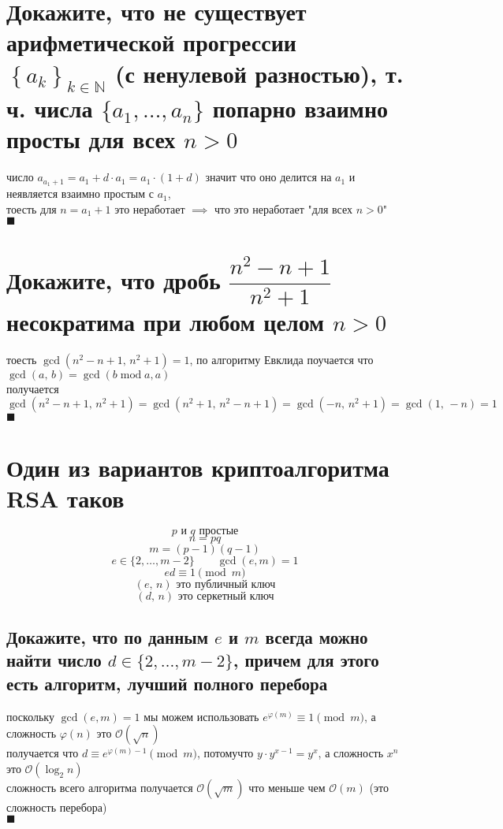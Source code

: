 \documentclass{article}
\newcommand{\Mod}[1]{\pmod{#1}}
\renewcommand{\mod}{\operatorname{mod}}
\newcommand{\bigO}{\mathcal{O}}
\begin{document}
  \section{Докажите, что не существует арифметической прогрессии $\left\{a_k\right\}_{k\in\mathbb{N}}$ (с ненулевой разностью), т. ч. числа $\{a_1,\dots, a_n\}$ попарно взаимно просты для всех $n > 0$}
  число $a_{a_1+1} = a_1 + d \cdot a_1 = a_1 \cdot (1+d)$ значит что оно делится на $a_1$ и неявляется взаимно простым с $a_1$, \\
  тоесть для $n = a_1+1$ это неработает $\implies$ что это неработает "для всех $n > 0$"{} \\
  $\blacksquare$

  \section{Докажите, что дробь $\dfrac{n^2-n+1}{n^2+1}$ несократима при любом целом $n>0$}
  тоесть $\gcd(n^2-n+1,\, n^2+1) = 1$, по алгоритму Евклида поучается что $\gcd(a,\, b) = \gcd(b \mod a, a)$ \\
  получается $\gcd(n^2-n+1,\, n^2+1) = \gcd(n^2+1,\, n^2-n+1) = \gcd(-n,\, n^2+1) = \gcd(1,\, -n) = 1$ \\
  $\blacksquare$

  \section{Один из вариантов криптоалгоритма RSA таков}
  \[ p \text{ и } q \text{ простые} \]
  \[ n = pq \]
  \[ m = (p-1)(q-1) \]
  \[ e \in \{2,\dots,m-2\} \qquad \gcd(e,m) = 1 \]
  \[ ed \equiv 1 \Mod{m} \]
  \[ (e,\, n) \text{ это публичный ключ} \]
  \[ (d,\, n) \text{ это серкетный ключ} \]

  \subsection{Докажите, что по данным $e$ и $m$ всегда можно найти число $d \in \{2,\dots,m-2\}$, причем для этого есть алгоритм, лучший полного перебора}
  поскольку $ \gcd(e,m) = 1 $ мы можем использовать $ e^{\varphi(m)} \equiv 1 \Mod{m} $, а сложность $\varphi(n)$ это $\bigO(\sqrt{n})$ \\
  получается что $d \equiv e^{\varphi(m)-1} \Mod{m}$, потомучто $y \cdot y^{x-1} = y^x$, а сложность $x^n$ это $\bigO(\log_2{n})$ \\
  сложность всего алгоритма получается $\bigO(\sqrt{m})$ что меньше чем $\bigO(m)$ (это сложность перебора) \\
  $\blacksquare$
\end{document}
